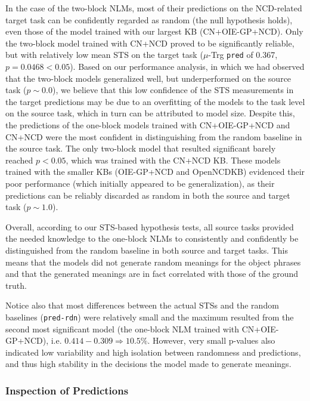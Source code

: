 \documentclass[preprint]{elsarticle}
\begin{document}
In the case of the two-block NLMs, most of their predictions on the NCD-related target task can be confidently regarded as random (the null hypothesis holds), even those of the model trained with our largest KB (CN+OIE-GP+NCD). Only the two-block model trained with CN+NCD proved to be significantly reliable, but with relatively low mean STS on the target task ($\mu$-Trg \texttt{pred} of 0.367, $p=0.0468<0.05$). Based on our performance analysis, in which we had observed that the two-block models generalized well, but underperformed on the source task ($p\sim 0.0$), we believe that this low confidence of the STS measurements in the target predictions may be due to an overfitting of the models to the task level on the source task, which in turn can be attributed to model size. Despite this, the predictions of the one-block models trained with CN+OIE-GP+NCD and CN+NCD were the most confident in distinguishing from the random baseline in the source task. The only two-block model that resulted significant barely reached $p<0.05$, which was trained with the CN+NCD KB. These models trained with the smaller KBs (OIE-GP+NCD and OpenNCDKB) evidenced their poor performance (which initially appeared to be generalization), as their predictions can be reliably discarded as random in both the source and target task ($p\sim 1.0$).

Overall, according to our STS-based hypothesis tests, all source tasks provided the needed knowledge to the one-block NLMs to consistently and confidently be distinguished from the random baseline in both source and target tasks. This means that the models did not generate random meanings for the object phrases and that the generated meanings are in fact correlated with those of the ground truth. 

Notice also that most differences between the actual STSs and the random baselines (\texttt{pred-rdn}) were relatively small and the maximum resulted from the second most significant model (the one-block NLM trained with CN+OIE-GP+NCD), i.e. $0.414 - 0.309 \Rightarrow 10.5\%$. However, very small p-values also indicated low variability and high isolation between randomness and predictions, and thus high stability in the decisions the model made to generate meanings.

\subsubsection{Inspection of Predictions}
\end{document}
